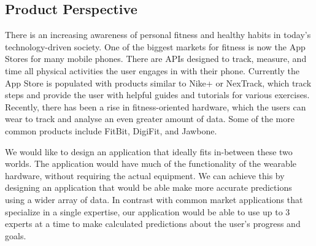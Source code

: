 \documentclass[12pt,letterpaper]{article}
\begin{document}
\subsection{Product Perspective}
There is an increasing awareness of personal fitness and healthy habits in today's technology-driven society.
One of the biggest markets for fitness is now the App Stores for many mobile phones. There are APIs designed to track, measure, and time all physical activities the user engages in with their phone. Currently the App Store is populated with products similar to Nike+ or NexTrack, which track steps and provide the user with helpful guides and tutorials for various exercises. Recently, there has been a rise in fitness-oriented hardware, which the users can wear to track and analyse an even greater amount of data. Some of the more common products include FitBit, DigiFit, and Jawbone. 

We would like to design an application that ideally fits in-between these two worlds. The application would have much of the functionality of the wearable hardware, without requiring the actual equipment. We can achieve this by designing an application that would be able make more accurate predictions using a wider array of data. In contrast with common market applications that specialize in a single expertise, our application would be able to use up to 3 experts at a time to make calculated predictions about the user's progress and goals. 
\end{document}
